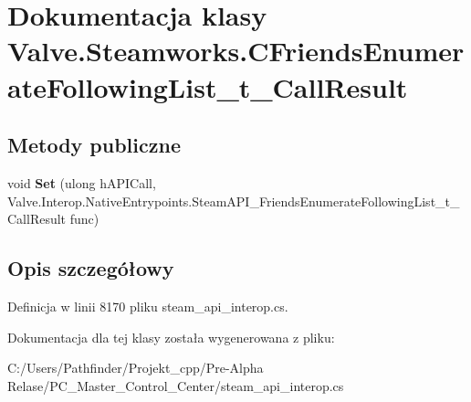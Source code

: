 \hypertarget{class_valve_1_1_steamworks_1_1_c_friends_enumerate_following_list__t___call_result}{}\section{Dokumentacja klasy Valve.\+Steamworks.\+C\+Friends\+Enumerate\+Following\+List\+\_\+t\+\_\+\+Call\+Result}
\label{class_valve_1_1_steamworks_1_1_c_friends_enumerate_following_list__t___call_result}
\subsection*{Metody publiczne}
\begin{DoxyCompactItemize}
\item 
\mbox{\label{class_valve_1_1_steamworks_1_1_c_friends_enumerate_following_list__t___call_result_a2a4475a38d0e491b6ae2550125b07df2}} 
void {\bfseries Set} (ulong h\+A\+P\+I\+Call, Valve.\+Interop.\+Native\+Entrypoints.\+Steam\+A\+P\+I\+\_\+\+Friends\+Enumerate\+Following\+List\+\_\+t\+\_\+\+Call\+Result func)
\end{DoxyCompactItemize}


\subsection{Opis szczegółowy}


Definicja w linii 8170 pliku steam\+\_\+api\+\_\+interop.\+cs.



Dokumentacja dla tej klasy została wygenerowana z pliku\+:\begin{DoxyCompactItemize}
\item 
C\+:/\+Users/\+Pathfinder/\+Projekt\+\_\+cpp/\+Pre-\/\+Alpha Relase/\+P\+C\+\_\+\+Master\+\_\+\+Control\+\_\+\+Center/steam\+\_\+api\+\_\+interop.\+cs\end{DoxyCompactItemize}
